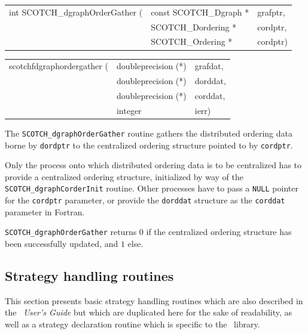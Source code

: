 \begin{itemize}
\progsyn

{\tt\begin{tabular}{l@{}ll}
int SCOTCH\_dgraphOrderGather ( & const SCOTCH\_Dgraph * & grafptr, \\
                                & SCOTCH\_Dordering *    & cordptr, \\
                                & SCOTCH\_Ordering *     & cordptr)
\end{tabular}}

{\tt\begin{tabular}{l@{}ll}
scotchfdgraphordergather ( & doubleprecision (*) & grafdat, \\
                           & doubleprecision (*) & dorddat, \\
                           & doubleprecision (*) & corddat, \\
                           & integer             & ierr)
\end{tabular}}

\progdes

The {\tt SCOTCH\_dgraph\lbt Order\lbt Gather} routine gathers the
distributed ordering data borne by {\tt dordptr} to the
centralized ordering structure pointed to by {\tt cordptr}.

Only the process onto which distributed ordering data is to be
centralized has to provide a centralized ordering structure,
initialized by way of the {\tt SCOTCH\_dgraph\lbt Corder\lbt Init}
routine. Other processes have to pass a \texttt{NULL} pointer for the
\texttt{cordptr} parameter, or provide the \texttt{dorddat} structure
as the \texttt{corddat} parameter in Fortran.

\progret

{\tt SCOTCH\_dgraphOrderGather} returns $0$ if the centralized
ordering structure has been successfully updated, and $1$ else.
\end{itemize}

\subsection{Strategy handling routines}
\label{sec-lib-strat}

This section presents basic strategy handling routines which are also
described in the {\it\scotch\ User's Guide} but which are duplicated
here for the sake of readability, as well as a strategy declaration
routine which is specific to the \ptscotch\ library.

